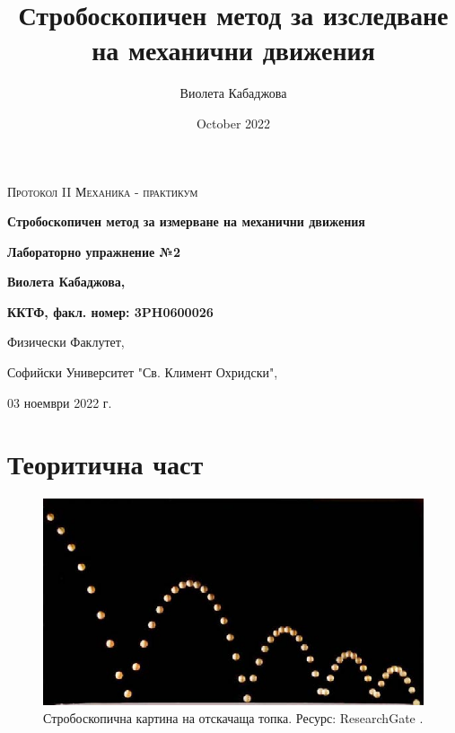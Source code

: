 \documentclass[12pt]{article}
\title{Стробоскопичен метод за изследване на механични движения}
\author{Виолета Кабаджова}
\date{October 2022}
\begin{document}
\begin{titlepage}
	\flushleft
	{\scshape\Large Протокол II \hspace{2cm} Механика - практикум\par}
	\vspace{2cm}
	{\huge\bfseries Стробоскопичен метод за измерване на механични движения\par}
	\vspace{1cm}
	{\LARGE\bfseries Лабораторно упражнение №2\par}
	\vspace{6cm}
    {\LARGE\bfseries Виолета Кабаджова, \par}
    {\large\bfseries ККТФ, факл. номер: 3PH0600026\par}
	\vspace{1cm}
	
	{\large Физически Факлутет, 
	
	Софийски Университет "Св. Климент Охридски",
	
	03 ноември 2022 г.\par}
	
\end{titlepage}
\section{Теоритична част}

\begin{figure}
\centering
\includegraphics[width=1\textwidth]{images/stroboscopic-img-basic.png}
\caption{\label{fig:strob-img-basic} Стробоскопична картина на отскачаща топка. Ресурс: ResearchGate \cite{Driscoll2016}.}
\end{figure}
\end{document}
